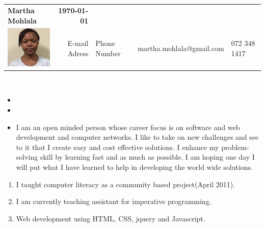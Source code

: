 %
\\ \\

\begin{tabular*}{6.5in}{l@{\extracolsep{\fill}}r}
\textbf{\Large } \textbf{Martha Mohlala} & \textbf{\today} \\
\includegraphics{./images/martha} & E-mail
Adress & Phone Number & {\color{green}martha.mohlala@gmail.com} & {\color{green}072 348 1417}
\end{tabular*}
\\

\begin{itemize}

\item {}

\item {}

\end{itemize}


\begin{itemize}
 \item %
I am an open minded person whose career focus is on software and web development and computer networks. I like to take on new challenges and see to it that I create easy and cost effective solutions. I enhance my problem-solving skill by learning fast and as much as possible. I am hoping one day I will put what I have  learned to help in developing the world wide solutions.
\end{itemize}



\begin{enumerate}
\item I taught computer literacy as a community based project(April 2011).
 \item I am currently teaching assistant for imperative programming.
 \item Web development using HTML, CSS, jquery and Javascript. 
\end{enumerate}

